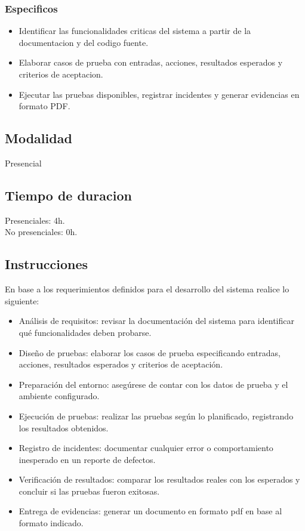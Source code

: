 \documentclass{article}
\begin{document}
\subsubsection{Especificos}
\begin{itemize}[leftmargin=*]
    \item Identificar las funcionalidades criticas del sistema a partir de la documentacion y del codigo fuente.
    \item Elaborar casos de prueba con entradas, acciones, resultados esperados y criterios de aceptacion.
    \item Ejecutar las pruebas disponibles, registrar incidentes y generar evidencias en formato PDF.
\end{itemize}

\subsection{Modalidad}
Presencial
\subsection{Tiempo de duracion}
Presenciales: 4h.\\
No presenciales: 0h.

\subsection{Instrucciones}
En base a los requerimientos definidos para el desarrollo del sistema realice lo siguiente:
\begin{itemize}[leftmargin=*]
    \item Análisis de requisitos: revisar la documentación del sistema para identificar qué funcionalidades deben probarse.
    \item Diseño de pruebas: elaborar los casos de prueba especificando entradas, acciones, resultados esperados y criterios de aceptación.
    \item Preparación del entorno: asegúrese de contar con los datos de prueba y el ambiente configurado.
    \item Ejecución de pruebas: realizar las pruebas según lo planificado, registrando los resultados obtenidos.
    \item Registro de incidentes: documentar cualquier error o comportamiento inesperado en un reporte de defectos.
    \item Verificación de resultados: comparar los resultados reales con los esperados y concluir si las pruebas fueron exitosas.
    \item Entrega de evidencias: generar un documento en formato pdf en base al formato indicado.
\end{itemize}
\end{document}
